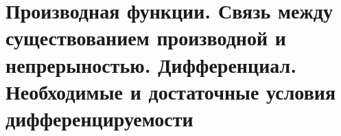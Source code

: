 \section{Производная функции. Связь между существованием производной и непрерыностью. Дифференциал. Необходимые и достаточные условия дифференцируемости}